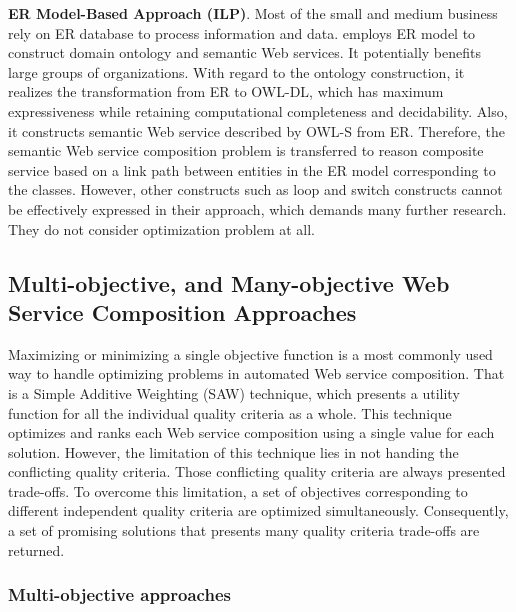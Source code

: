 \textbf{ER Model-Based Approach (ILP)}. Most of the small and medium business rely on ER database to process information and data. \cite{xu2010semantic} employs ER model to construct domain ontology and semantic Web services.  It potentially benefits large groups of organizations. With regard to the ontology construction, it realizes the transformation from ER to OWL-DL, which has maximum expressiveness while retaining computational completeness and decidability. Also,  it constructs semantic Web service described by OWL-S  from ER.  Therefore, the semantic Web service composition problem is transferred to reason composite service based on a link path between entities in the ER model corresponding to the classes.  However, other constructs such as loop and switch constructs cannot be effectively expressed in their approach, which demands many further research. They do not consider optimization problem at all.

\subsection{Multi-objective, and Many-objective Web Service Composition Approaches}\label{multiobjective}
Maximizing or minimizing a single objective function is a most commonly used way to handle optimizing problems in automated Web service composition.  That is a Simple Additive Weighting (SAW) \cite{hwang1981lecture} technique, which presents a utility function for all the individual quality criteria as a whole. This technique optimizes and ranks each Web service composition using a single value for each solution. However,  the limitation of this technique lies in not handing the conflicting quality criteria.  Those conflicting quality criteria are always presented trade-offs. To overcome this limitation, a set of objectives corresponding to different independent quality criteria are optimized simultaneously. Consequently,  a set of promising solutions that presents many quality criteria trade-offs are returned.


\subsubsection{Multi-objective approaches}\label{MultiObjective}

